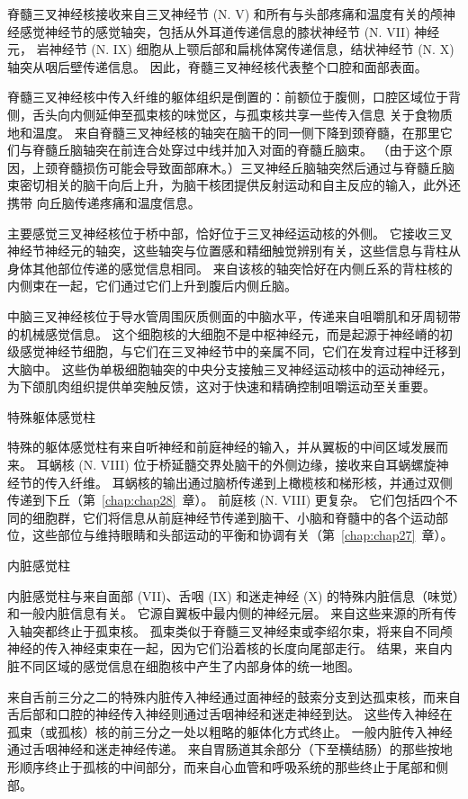 脊髓三叉神经核接收来自三叉神经节 (N. V) 和所有与头部疼痛和温度有关的颅神经感觉神经节的感觉轴突，包括从外耳道传递信息的膝状神经节 (N. VII) 神经元， 岩神经节 (N. IX) 细胞从上颚后部和扁桃体窝传递信息，结状神经节 (N. X) 轴突从咽后壁传递信息。
因此，脊髓三叉神经核代表整个口腔和面部表面。


脊髓三叉神经核中传入纤维的躯体组织是倒置的：前额位于腹侧，口腔区域位于背侧，舌头向内侧延伸至孤束核的味觉区，与孤束核共享一些传入信息 关于食物质地和温度。
来自脊髓三叉神经核的轴突在脑干的同一侧下降到颈脊髓，在那里它们与脊髓丘脑轴突在前连合处穿过中线并加入对面的脊髓丘脑束。
（由于这个原因，上颈脊髓损伤可能会导致面部麻木。）三叉神经丘脑轴突然后通过与脊髓丘脑束密切相关的脑干向后上升，为脑干核团提供反射运动和自主反应的输入，此外还携带 向丘脑传递疼痛和温度信息。


主要感觉三叉神经核位于桥中部，恰好位于三叉神经运动核的外侧。
它接收三叉神经节神经元的轴突，这些轴突与位置感和精细触觉辨别有关，这些信息与背柱从身体其他部位传递的感觉信息相同。
来自该核的轴突恰好在内侧丘系的背柱核的内侧束在一起，它们通过它们上升到腹后内侧丘脑。


中脑三叉神经核位于导水管周围灰质侧面的中脑水平，传递来自咀嚼肌和牙周韧带的机械感觉信息。
这个细胞核的大细胞不是中枢神经元，而是起源于神经嵴的初级感觉神经节细胞，与它们在三叉神经节中的亲属不同，它们在发育过程中迁移到大脑中。
这些伪单极细胞轴突的中央分支接触三叉神经运动核中的运动神经元，为下颌肌肉组织提供单突触反馈，这对于快速和精确控制咀嚼运动至关重要。


特殊躯体感觉柱

特殊的躯体感觉柱有来自听神经和前庭神经的输入，并从翼板的中间区域发展而来。
耳蜗核 (N. VIII) 位于桥延髓交界处脑干的外侧边缘，接收来自耳蜗螺旋神经节的传入纤维。
耳蜗核的输出通过脑桥传递到上橄榄核和梯形核，并通过双侧传递到下丘（第~\ref{chap:chap28}~章）。
前庭核 (N. VIII) 更复杂。
它们包括四个不同的细胞群，它们将信息从前庭神经节传递到脑干、小脑和脊髓中的各个运动部位，这些部位与维持眼睛和头部运动的平衡和协调有关（第~\ref{chap:chap27}~章）。


内脏感觉柱

内脏感觉柱与来自面部 (VII)、舌咽 (IX) 和迷走神经 (X) 的特殊内脏信息（味觉）和一般内脏信息有关。 它源自翼板中最内侧的神经元层。
来自这些来源的所有传入轴突都终止于孤束核。
孤束类似于脊髓三叉神经束或李绍尔束，将来自不同颅神经的传入神经束束在一起，因为它们沿着核的长度向尾部走行。
结果，来自内脏不同区域的感觉信息在细胞核中产生了内部身体的统一地图。


来自舌前三分之二的特殊内脏传入神经通过面神经的鼓索分支到达孤束核，而来自舌后部和口腔的神经传入神经则通过舌咽神经和迷走神经到达。
这些传入神经在孤束（或孤核）核的前三分之一处以粗略的躯体化方式终止。
一般内脏传入神经通过舌咽神经和迷走神经传递。
来自胃肠道其余部分（下至横结肠）的那些按地形顺序终止于孤核的中间部分，而来自心血管和呼吸系统的那些终止于尾部和侧部。


